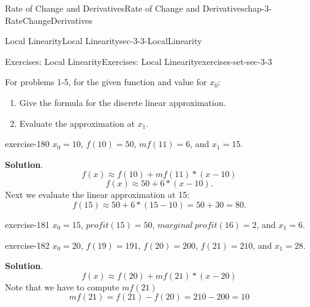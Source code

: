 \documentclass[oneside,10pt,]{book}
\numberwithin{equation}{section}
\begin{document}
\begin{chapterptx}{Rate of Change and Derivatives}{}{Rate of Change and Derivatives}{}{}{chap-3-RateChangeDerivatives}
\begin{sectionptx}{Local Linearity}{}{Local Linearity}{}{}{sec-3-3-LocalLinearity}
%
\begin{exercises-subsection-numberless}{Exercises: Local Linearity}{}{Exercises: Local Linearity}{}{}{exercises-set-sec-3-3}
\par\medskip\noindent%
\hypertarget{exercisegroup-18}{}%
\hypertarget{p-1163}{}%
For problems 1-5, for the given function and value for \(x_0\):%
\leavevmode%
\begin{enumerate}[label=(\alph*)]
\item\hypertarget{li-365}{}\hypertarget{p-1164}{}%
Give the formula for the discrete linear approximation.%
\item\hypertarget{li-366}{}\hypertarget{p-1165}{}%
Evaluate the approximation at \(x_1\).%
\end{enumerate}
\begin{exercisegroup}
\begin{divisionexerciseeg}{1}{}{}{exercise-180}%
\hypertarget{p-1166}{}%
\(x_0=10\), \(f(10)=50\), \(mf(11)=6\), and \(x_1=15\).%
\par\smallskip%
\noindent\textbf{Solution}.\hypertarget{solution-89}{}\quad%
%
\begin{equation*}
f(x)\approx f(10)+mf(11)*(x-10)
\end{equation*}
%
\begin{equation*}
f(x)\approx 50+6*(x-10).
\end{equation*}
\hypertarget{p-1167}{}%
Next we evaluate the linear approximation at 15:%
%
\begin{equation*}
f(15)\approx 50+6*(15-10)=50+30=80.
\end{equation*}
\end{divisionexerciseeg}%
\begin{divisionexerciseeg}{2}{}{}{exercise-181}%
\hypertarget{p-1168}{}%
\(x_0=15\), \(profit(15)=50\), \(marginal\ profit(16)=2\), and \(x_1=6\).%
\end{divisionexerciseeg}%
\begin{divisionexerciseeg}{3}{}{}{exercise-182}%
\hypertarget{p-1169}{}%
\(x_0=20\), \(f(19)=191\), \(f(20)=200\), \(f(21)=210\), and \(x_1=28\).%
\par\smallskip%
\noindent\textbf{Solution}.\hypertarget{solution-90}{}\quad%
%
\begin{equation*}
f(x)\approx f(20)+mf(21)*(x-20)
\end{equation*}
\hypertarget{p-1170}{}%
Note that we have to compute \(mf(21)\)%
%
\begin{equation*}
mf(21)=f(21)-f(20)= 210-200=10
\end{equation*}

\end{divisionexerciseeg}
\end{exercisegroup}
\end{exercises-subsection-numberless}
\end{sectionptx}
\end{chapterptx}
\end{document}
